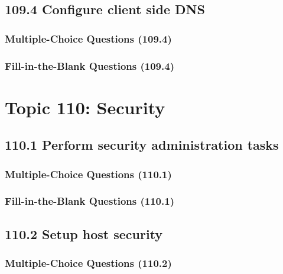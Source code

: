 \documentclass[a4paper]{report}
\begin{document}
\subsection*{109.4 Configure client side DNS}
\subsubsection*{Multiple-Choice Questions (109.4)}

\subsubsection*{Fill-in-the-Blank Questions (109.4)}


\section*{Topic 110: Security}

\subsection*{110.1 Perform security administration tasks}
\subsubsection*{Multiple-Choice Questions (110.1)}

\subsubsection*{Fill-in-the-Blank Questions (110.1)}

\subsection*{110.2 Setup host security}
\subsubsection*{Multiple-Choice Questions (110.2)}
\end{document}
